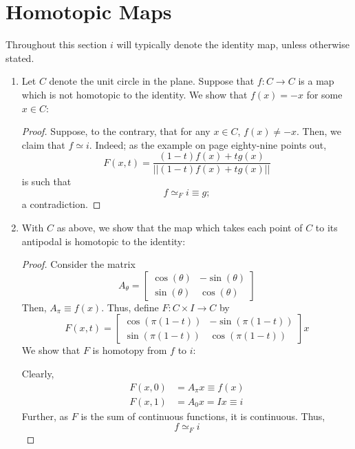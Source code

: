 \documentclass{book}
\begin{document}
\section{Homotopic Maps}
Throughout this section $i$ will typically denote the identity map, unless otherwise stated. 
\begin{enumerate}[(1)]
    \item Let $C$ denote the unit circle in the plane. Suppose that $f: C \rightarrow C$ is a map which is not homotopic to the identity. We show that $f(x) = -x$ for some $x \in C$: 
        \begin{proof} Suppose, to the contrary, that for any $x \in C$, $f(x) \neq -x$. Then, we claim that $f \simeq i$. Indeed; as the example on page eighty-nine points out, 
            \[F(x,t) = \frac{(1-t)f(x) + tg(x)}{||(1-t)f(x) + tg(x)||}\]
            is such that 
            \[f \simeq_F i \equiv g;\]
            a contradiction.
        \end{proof}

    \item With $C$ as above, we show that the map which takes each point of $C$ to its antipodal is homotopic to the identity: 
        \begin{proof} Consider the matrix 
            \[ A_\theta = 
            \begin{bmatrix}
                \cos(\theta) & -\sin(\theta) \\
                \sin(\theta) & \cos(\theta) 
            \end{bmatrix}
            \] 
            Then, $A_\pi \equiv f(x) $. Thus, define $F: C \times I \rightarrow C$ by 
            \[ F (x,t) =
            \begin{bmatrix}
                \cos( \pi(1-t)) & -\sin(\pi(1-t)) \\
                \sin(\pi(1-t)) & \cos(\pi(1-t)) 
            \end{bmatrix} x
            \]
            We show that $F$ is homotopy from $f$ to $i$: 
            \par Clearly, 
            \begin{align*}
                F(x,0) &= A_\pi x \equiv f(x) \\
                F(x,1) &= A_0 x = Ix \equiv i
            \end{align*}
            Further, as $F$ is the sum of continuous functions, it is continuous. Thus, 
            \[f \simeq_F i\]
        \end{proof}


\end{enumerate}
\end{document}
